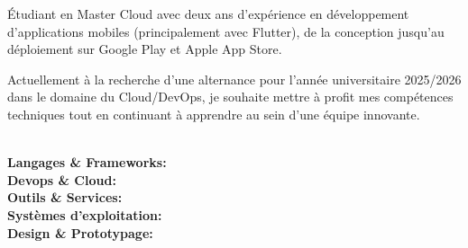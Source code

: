 \documentclass[9pt]{developercv} %
\begin{document}
\begin{minipage}[t]{\textwidth}
    \vspace{-6pt}

    Étudiant en Master Cloud avec deux ans d'expérience en développement d'applications mobiles (principalement avec Flutter), de la conception jusqu'au déploiement sur Google Play et Apple App Store.

    Actuellement à la recherche d'une alternance pour l'année universitaire 2025/2026 dans le domaine du Cloud/DevOps, je souhaite mettre à profit mes compétences techniques tout en continuant à apprendre au sein d'une équipe innovante.
\end{minipage}
\begin{minipage}[t]{\textwidth}
    \\
    \vspace{6pt}
    \textbf{Langages \& Frameworks: } \\
    \vspace{6pt}
    \textbf{Devops \& Cloud: } \\
    \vspace{6pt}
    \textbf{Outils \& Services: } \\
    \vspace{6pt}
    \textbf{Systèmes d'exploitation: } \\
    \vspace{6pt}
    \textbf{Design \& Prototypage: } 
    \vspace{-12pt}
\end{minipage}

\end{document}
